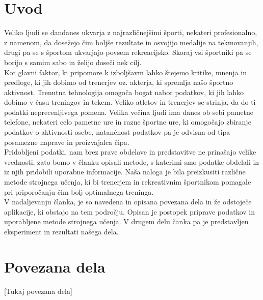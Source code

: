 \documentclass{acm_proc_article-sp}
\begin{document}
\maketitle
\begin{abstract}

\end{abstract}




\section{Uvod}
Veliko ljudi se dandanes ukvarja z najrazličnejšimi športi, nekateri profesionalno, z namenom, da dosežejo čim boljše rezultate in osvojijo medalije na tekmovanjih, drugi pa se s športom ukvarjajo povsem rekreacijsko. Skoraj vsi športniki pa se borijo s samim sabo in želijo doseči nek cilj.\\
Kot glavni faktor, ki pripomore k izboljšavm lahko štejemo kritike, mnenja in predloge, ki jih dobimo od trenerjev oz. akterja, ki spremlja našo športno aktivnost. Trenutna tehnologija omogoča bogat nabor podatkov, ki jih lahko dobimo v času treningov in tekem. Veliko atletov in trenerjev se strinja, da do ti podatki neprecenljivega pomena\cite{Liebermann}. Velika večina ljudi ima danes ob sebi pametne telefone, nekateri celo pametne ure in razne športne ure, ki omogočajo zbiranje podatkov o aktivnosti osebe, natančnost podatkov pa je odvisna od tipa posamezne naprave in proizvajalca čipa\cite{Case}.\\
Pridobljeni podatki, nam brez prave obdelave in predstavitve ne prinašajo velike vrednosti, zato bomo v  članku opisali metode, s katerimi smo podatke obdelali in iz njih pridobili uporabne informacije. Naša naloga je bila preizkusiti različne metode strojnega učenja, ki bi trenerjem in rekreativnim športnikom pomagale pri priporočanju čim bolj optimalnega treninga.\\
V nadaljevanju članka, je so navedena in opisana povezana dela in že odstoječe aplikacije, ki obstajo na tem področju. Opisan je postopek priprave podatkov in uporabljene metode strojnega učenja. V drugem delu čanka pa je predstavljen eksperiment in rezultati našega dela.
\section{Povezana dela}
[Tukaj povezana dela]
\end{document}
